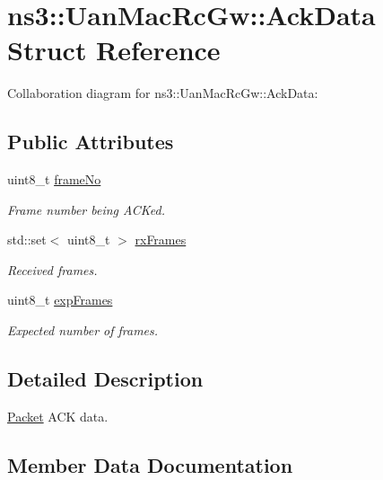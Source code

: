 \hypertarget{structns3_1_1UanMacRcGw_1_1AckData}{}\section{ns3\+:\+:Uan\+Mac\+Rc\+Gw\+:\+:Ack\+Data Struct Reference}
\label{structns3_1_1UanMacRcGw_1_1AckData}


Collaboration diagram for ns3\+:\+:Uan\+Mac\+Rc\+Gw\+:\+:Ack\+Data\+:
\subsection*{Public Attributes}
\begin{DoxyCompactItemize}
\item 
uint8\+\_\+t \hyperlink{structns3_1_1UanMacRcGw_1_1AckData_a4bba84663753920fd4dd55a84838c156}{frame\+No}
\begin{DoxyCompactList}\small\item\em Frame number being A\+CK\textquotesingle{}ed. \end{DoxyCompactList}\item 
std\+::set$<$ uint8\+\_\+t $>$ \hyperlink{structns3_1_1UanMacRcGw_1_1AckData_a74b12135a7e92a7e229e455535ddf16b}{rx\+Frames}
\begin{DoxyCompactList}\small\item\em Received frames. \end{DoxyCompactList}\item 
uint8\+\_\+t \hyperlink{structns3_1_1UanMacRcGw_1_1AckData_a28f52eb334f27e743967a3f63b7926cf}{exp\+Frames}
\begin{DoxyCompactList}\small\item\em Expected number of frames. \end{DoxyCompactList}\end{DoxyCompactItemize}


\subsection{Detailed Description}
\hyperlink{classns3_1_1Packet}{Packet} A\+CK data. 

\subsection{Member Data Documentation}
